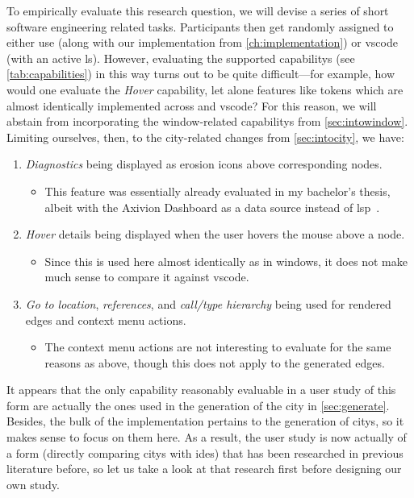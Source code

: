 \documentclass[../thesis]{subfiles}
\begin{document}
To empirically evaluate this research question, we will devise a series of short software engineering related tasks.
Participants then get randomly assigned to either use \SEE{} (along with our implementation from \cref{ch:implementation}) or \gls{vscode} (with an active \gls{ls}).
However, evaluating the supported \glspl{capability} (see \cref{tab:capabilities}) in this way turns out to be quite difficult---for example, how would one evaluate the \emph{Hover} \gls{capability}, let alone features like \glspl{token} which are almost identically implemented across \SEE{} and \gls{vscode}?
For this reason, we will abstain from incorporating the \gls{window}-related \glspl{capability} from \cref{sec:intowindow}.
Limiting ourselves, then, to the \gls{city}-related changes from \cref{sec:intocity}, we have:
\begin{enumerate}
	\item \emph{Diagnostics} being displayed as erosion icons above corresponding nodes.
	      \begin{itemize}
		      \item This feature was essentially already evaluated in my bachelor's thesis, albeit with the Axivion Dashboard as a data source instead of \gls{lsp}~\cite{galperin2021,galperin2022}.
	      \end{itemize}
	\item \emph{Hover} details being displayed when the user hovers the mouse above a node.
	      \begin{itemize}
		      \item Since this is used here almost identically as in \glspl{window}, it does not make much sense to compare it against \gls{vscode}.
	      \end{itemize}
	\item \emph{Go to location}, \emph{references}, and \emph{call/type hierarchy} being used for rendered edges and context menu actions.
	      \begin{itemize}
		      \item The context menu actions are not interesting to evaluate for the same reasons as above, though this does not apply to the generated edges.
	      \end{itemize}
\end{enumerate}

It appears that the only \gls{capability} reasonably evaluable in a user study of this form are actually the ones used in the generation of the \gls{city} in \cref{sec:generate}.
Besides, the bulk of the implementation pertains to the generation of \glspl{city}, so it makes sense to focus on them here.
As a result, the user study is now actually of a form (directly comparing \glspl{city} with \glspl{ide}) that has been researched in previous literature before, so let us take a look at that research first before designing our own study.
\end{document}
